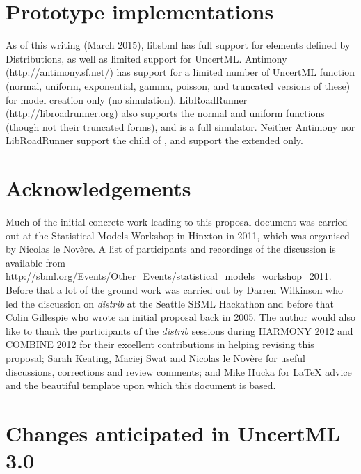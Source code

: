 \documentclass[draftspec]{sbmlpkgspec}
\newcommand{\distribshort}{\emph{distrib}\xspace}
\newcommand{\distrib}{Distributions\xspace}
\newcommand{\uncertml}{UncertML\xspace}
\begin{document}
\section{Prototype implementations}

As of this writing (March 2015), libsbml has full support for elements defined by \distrib, as well as limited support for \uncertml.  Antimony (\url{http://antimony.sf.net/}) has support for a limited number of \uncertml function (normal, uniform, exponential, gamma, poisson, and truncated versions of these) for model creation only (no simulation).  LibRoadRunner (\url{http://libroadrunner.org}) also supports the normal and uniform functions (though not their truncated forms), and is a full simulator.  Neither Antimony nor LibRoadRunner support the  child of \SBase, and support the extended \FunctionDefinition only.



\section{Acknowledgements}
\label{sec:acknowledgements}

Much of the initial concrete work leading to this proposal document
was carried out at the Statistical Models Workshop in Hinxton in 2011,
which was organised by Nicolas le Nov\`{e}re. A list of participants
and recordings of the discussion is available from
\url{http://sbml.org/Events/Other_Events/statistical_models_workshop_2011}.
Before that a lot of the ground work was carried out by Darren
Wilkinson who led the discussion on \distribshort at the Seattle SBML
Hackathon and before that Colin Gillespie who wrote an initial
proposal back in 2005. The author would also like to thank the
participants of the \distribshort sessions during HARMONY 2012 and
COMBINE 2012 for their excellent contributions in helping revising
this proposal; Sarah Keating, Maciej Swat and Nicolas le Nov\`{e}re
for useful discussions, corrections and review comments; and Mike
Hucka for \LaTeX{} advice and the beautiful template upon which this
document is based.

\appendix
\section{Changes anticipated in UncertML 3.0}
\end{document}
